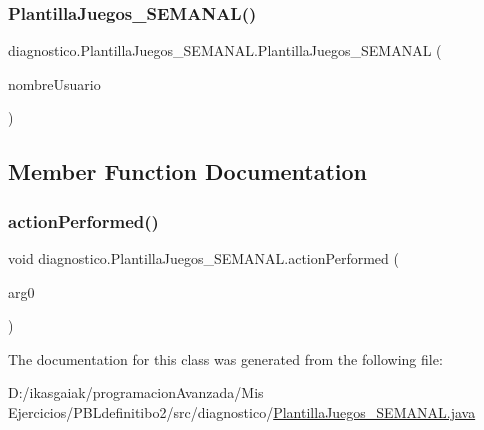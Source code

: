 \subsubsection{\texorpdfstring{Plantilla\+Juegos\+\_\+\+S\+E\+M\+A\+N\+A\+L()}{PlantillaJuegos\_SEMANAL()}}
{\footnotesize\ttfamily diagnostico.\+Plantilla\+Juegos\+\_\+\+S\+E\+M\+A\+N\+A\+L.\+Plantilla\+Juegos\+\_\+\+S\+E\+M\+A\+N\+AL (\begin{DoxyParamCaption}\item[{String}]{nombre\+Usuario }\end{DoxyParamCaption})}



\subsection{Member Function Documentation}
\mbox{\label{classdiagnostico_1_1_plantilla_juegos___s_e_m_a_n_a_l_a7a221c980d95773abe66602699acab63}} 
\subsubsection{\texorpdfstring{action\+Performed()}{actionPerformed()}}
{\footnotesize\ttfamily void diagnostico.\+Plantilla\+Juegos\+\_\+\+S\+E\+M\+A\+N\+A\+L.\+action\+Performed (\begin{DoxyParamCaption}\item[{Action\+Event}]{arg0 }\end{DoxyParamCaption})}



The documentation for this class was generated from the following file\+:\begin{DoxyCompactItemize}
\item 
D\+:/ikasgaiak/programacion\+Avanzada/\+Mis Ejercicios/\+P\+B\+Ldefinitibo2/src/diagnostico/\mbox{\hyperlink{_plantilla_juegos___s_e_m_a_n_a_l_8java}{Plantilla\+Juegos\+\_\+\+S\+E\+M\+A\+N\+A\+L.\+java}}\end{DoxyCompactItemize}
